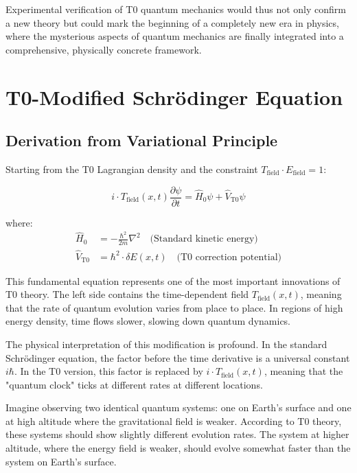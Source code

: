 \documentclass[12pt,a4paper]{article}
\newcommand{\deltaE}{\delta E}
\theoremstyle{definition}
\theoremstyle{remark}
\begin{document}
Experimental verification of T0 quantum mechanics would thus not only confirm a new theory but could mark the beginning of a completely new era in physics, where the mysterious aspects of quantum mechanics are finally integrated into a comprehensive, physically concrete framework.
\section{T0-Modified Schrödinger Equation}

\subsection{Derivation from Variational Principle}

Starting from the T0 Lagrangian density and the constraint $T_{\text{field}} \cdot E_{\text{field}} = 1$:

\begin{equation}
	\boxed{i \cdot T_{\text{field}}(x,t) \frac{\partial\psi}{\partial t} = \hat{H}_0 \psi + \hat{V}_{\text{T0}} \psi}
	\label{eq:t0_schrodinger_general}
\end{equation}

where:
\begin{align}
	\hat{H}_0 &= -\frac{\hbar^2}{2m} \nabla^2 \quad \text{(Standard kinetic energy)} \\
	\hat{V}_{\text{T0}} &= \hbar^2 \cdot \deltaE(x,t) \quad \text{(T0 correction potential)}
\end{align}

This fundamental equation represents one of the most important innovations of T0 theory. The left side contains the time-dependent field $T_{\text{field}}(x,t)$, meaning that the rate of quantum evolution varies from place to place. In regions of high energy density, time flows slower, slowing down quantum dynamics.

The physical interpretation of this modification is profound. In the standard Schrödinger equation, the factor before the time derivative is a universal constant $i\hbar$. In the T0 version, this factor is replaced by $i \cdot T_{\text{field}}(x,t)$, meaning that the "quantum clock" ticks at different rates at different locations.

Imagine observing two identical quantum systems: one on Earth's surface and one at high altitude where the gravitational field is weaker. According to T0 theory, these systems should show slightly different evolution rates. The system at higher altitude, where the energy field is weaker, should evolve somewhat faster than the system on Earth's surface.
\end{document}
